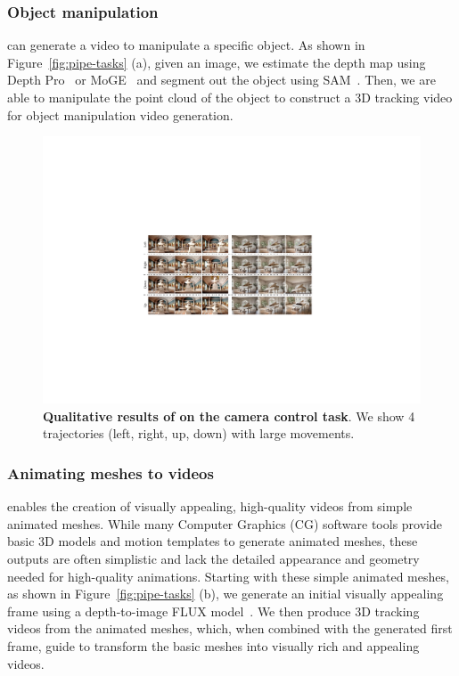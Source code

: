 \subsubsection{Object manipulation}
\methodname can generate a video to manipulate a specific object. As shown in Figure~\ref{fig:pipe-tasks} (a), given an image, we estimate the depth map using Depth Pro~\cite{bochkovskii2024depth} or MoGE~\cite{wang2024mogeunlockingaccuratemonocular} and segment out the object using SAM~\cite{kirillov2023segment}. Then, we are able to manipulate the point cloud of the object to construct a 3D tracking video for object manipulation video generation.

\begin{figure}[h]
    \centering
    \includegraphics[width=\textwidth]{pictures/cam1.pdf}
    \caption{\textbf{Qualitative results of \methodname on the camera control task}. We show 4 trajectories (left, right, up, down) with large movements.}
    \label{fig:camctrl}
\end{figure}

\subsubsection{Animating meshes to videos}
\methodname enables the creation of visually appealing, high-quality videos from simple animated meshes. While many Computer Graphics (CG) software tools provide basic 3D models and motion templates to generate animated meshes, these outputs are often simplistic and lack the detailed appearance and geometry needed for high-quality animations. Starting with these simple animated meshes, as shown in Figure~\ref{fig:pipe-tasks} (b), we generate an initial visually appealing frame using a depth-to-image FLUX model~\cite{flux}. We then produce 3D tracking videos from the animated meshes, which, when combined with the generated first frame, guide \methodname to transform the basic meshes into visually rich and appealing videos.

